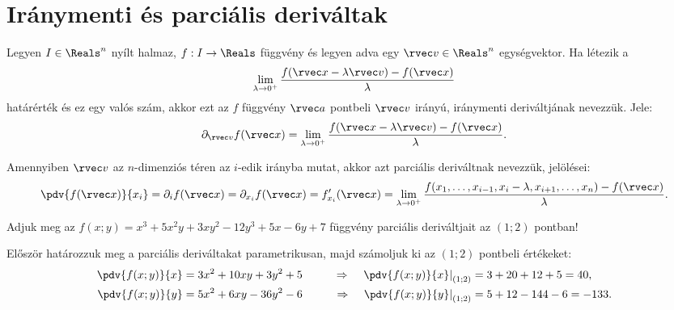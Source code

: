 \clearpage
\section{Iránymenti és parciális deriváltak}\label{sec-03-02}

\begin{definition}
  Legyen $I \in \Reals^n$ nyílt halmaz, $f: I \to \Reals$ függvény és
  legyen adva egy $\rvec v \in \Reals^n$ egységvektor. Ha létezik a
  $$
    \lim_{\lambda \to 0^+} \frac{
      f(\rvec x - \lambda \rvec v) - f(\rvec x)
    }{
      \lambda
    }
  $$
  határérték és ez egy valós szám, akkor ezt az $f$ függvény $\rvec a$
  pontbeli $\rvec v$ irányú, iránymenti deriváltjának nevezzük. Jele:
  $$
    \partial_{\rvec v} f(\rvec x) = \lim_{\lambda \to 0^+} \frac{
      f(\rvec x - \lambda \rvec v) - f(\rvec x)
    }{
      \lambda
    }
    \text.
  $$
\end{definition}

\begin{note}
  Amennyiben $\rvec v$ az $n$-dimenziós téren az $i$-edik irányba mutat,
  akkor azt parciális deriváltnak nevezzük, jelölései:
  $$
    \pdv{f(\rvec x)}{x_i}
    = \partial_i f(\rvec x)
    = \partial_{x_i} f(\rvec x)
    = f'_{x_i}(\rvec x)
    = \lim_{\lambda \to 0^+} \frac{
      f(x_1, \ldots, x_{i-1}, x_i - \lambda, x_{i+1}, \ldots, x_n) - f(\rvec x)
    }{
      \lambda
    }
    \text.
  $$
\end{note}

\begin{example}
  Adjuk meg az $f(x; y) = x^3 + 5x^2y + 3xy^2 - 12y^3 + 5x - 6y + 7$ függvény
  parciális deriváltjait az $(1;2)$ pontban!

  \hdashrule[.8ex][x]{\dimexpr\textwidth}{1pt}{2mm 3pt}

  Először határozzuk meg a parciális deriváltakat parametrikusan, majd
  számoljuk ki az $(1;2)$ pontbeli értékeket:
  \begin{alignat*}{9}
    \pdv{f(x; y)}{x}                      & = 3x^2 + 10xy + 3y^2 + 5
                                          & \qquad\Rightarrow\quad
    \left.\pdv{f(x; y)}{x}\right|_{(1;2)} & = 3 + 20 + 12 + 5 = 40
    \text,
    \\
    \pdv{f(x; y)}{y}                      & = 5x^2 + 6xy - 36y^2 - 6
                                          & \qquad\Rightarrow\quad
    \left.\pdv{f(x; y)}{y}\right|_{(1;2)} & = 5 + 12 - 144 - 6 = -133
    \text.
  \end{alignat*}
\end{example}

